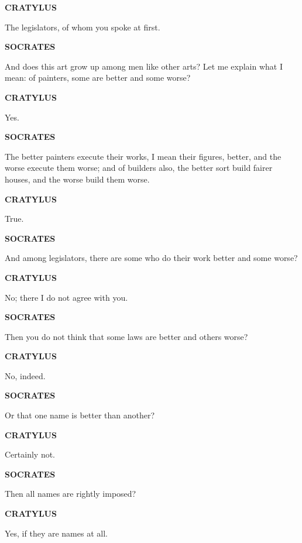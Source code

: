 \documentclass[11pt,letter]{article}
\begin{document}
\par \textbf{CRATYLUS}
\par   The legislators, of whom you spoke at first.

\par \textbf{SOCRATES}
\par   And does this art grow up among men like other arts? Let me explain what I mean:  of painters, some are better and some worse?

\par \textbf{CRATYLUS}
\par   Yes.

\par \textbf{SOCRATES}
\par   The better painters execute their works, I mean their figures, better, and the worse execute them worse; and of builders also, the better sort build fairer houses, and the worse build them worse.

\par \textbf{CRATYLUS}
\par   True.

\par \textbf{SOCRATES}
\par   And among legislators, there are some who do their work better and some worse?

\par \textbf{CRATYLUS}
\par   No; there I do not agree with you.

\par \textbf{SOCRATES}
\par   Then you do not think that some laws are better and others worse?

\par \textbf{CRATYLUS}
\par   No, indeed.

\par \textbf{SOCRATES}
\par   Or that one name is better than another?

\par \textbf{CRATYLUS}
\par   Certainly not.

\par \textbf{SOCRATES}
\par   Then all names are rightly imposed?

\par \textbf{CRATYLUS}
\par   Yes, if they are names at all.
\end{document}

